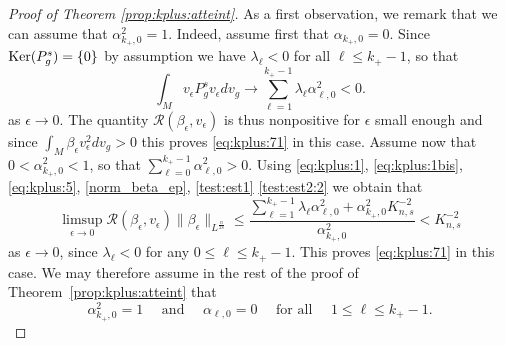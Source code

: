 \documentclass[10pt]{amsart}
\numberwithin{equation}{section}
\def\be{{\beta}}
\def\ep{{\varepsilon}}
\def\ker{{\mathop{\rm Ker}}}
\def \ep{\epsilon}
\theoremstyle{plain}
\theoremstyle{remark}
\begin{document}
\begin{proof}[Proof of Theorem \ref{prop:kplus:atteint}]
As a first observation, we remark that we can assume that $\alpha_{k_+,0}^2 = 1$. Indeed, assume first that $\alpha_{k_+,0} = 0$. Since $\ker (P_g^s) = \{0\}$ by assumption we have $\lambda_{\ell} <0$ for all $\ell \le k_+-1$, so that 
$$  \int_{M} v_\ep P_g^s v_\ep dv_g  \to  \sum_{\ell=1}^{k_+-1} \lambda_\ell \alpha_{\ell,0}^2 <0.$$
as $\ep \to 0$. The quantity $\mathcal{R}(\beta_\ep, v_\ep)$ is thus nonpositive for $\ep$ small enough and since $\int_{M} \beta_\ep v_{\ep}^2 dv_g >0$ this proves \eqref{eq:kplus:71} in this case. Assume now that $0 <\alpha_{k_+,0}^2 < 1$, so that $\sum_{\ell=0}^{k_+-1} \alpha_{\ell,0}^2 >0$. Using  \eqref{eq:kplus:1}, \eqref{eq:kplus:1bis}, \eqref{eq:kplus:5},  \eqref{norm_beta_ep}, \eqref{test:est1} 
\eqref{test:est2:2} we obtain that 
$$ \limsup_{\ep \to 0} \mathcal{R}(\beta_\ep, v_\ep) \|\be_\ep\|_{L^{\frac{n}{2s}}} \le \frac{\sum_{\ell=1}^{k_+-1} \lambda_{\ell} \alpha_{\ell,0}^2 + \alpha_{k_+,0}^2 K_{n,s}^{-2}}{\alpha_{k_+,0}^2} < K_{n,s}^{-2}  $$
as $\ep \to 0$, since $\lambda_\ell < 0$ for any $0 \le \ell \le k_+-1$. This proves \eqref{eq:kplus:71} in this case. We may therefore assume in the rest of the proof of Theorem~\ref{prop:kplus:atteint} that 
$$\alpha_{k_+,0}^2 = 1 \quad \text{ and } \quad \alpha_{\ell,0} = 0 \quad \text{ for all } \quad  1 \le \ell \le k_+-1.$$ 

\medskip


\end{proof}
\end{document}
